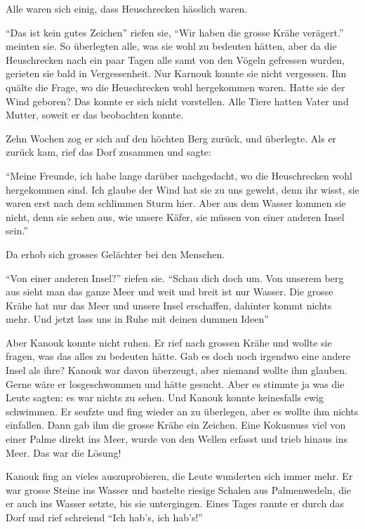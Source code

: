 Alle waren sich einig, dass Heuschrecken hässlich waren. 

\enquote{Das ist kein gutes Zeichen} riefen sie, \enquote{Wir haben die grosse Krähe verägert.} meinten sie. So überlegten alle, was sie wohl zu bedeuten hätten, aber da die Heuschrecken nach ein paar Tagen alle samt von den Vögeln gefressen wurden, gerieten sie bald in Vergessenheit. Nur Karnouk konnte sie nicht vergessen. Ihn quälte die Frage, wo die Heuschrecken wohl hergekommen waren. Hatte sie der Wind geboren? Das konnte er sich nicht vorstellen. Alle Tiere hatten Vater und Mutter, soweit er das beobachten konnte. 

Zehn Wochen zog er sich auf den höchten Berg zurück, und überlegte. Als er zurück kam, rief das Dorf zusammen und sagte: 

\enquote{Meine Freunde, ich habe lange darüber nachgedacht, wo die Heuschrecken wohl hergekommen sind. Ich glaube der Wind hat sie zu uns geweht, denn ihr wisst, sie waren erst nach dem schlimmen Sturm hier. Aber aus dem Wasser kommen sie nicht, denn sie sehen aus, wie unsere Käfer, sie müssen von einer anderen Insel sein.}

Da erhob sich grosses Gelächter bei den Menschen.

\enquote{Von einer anderen Insel?} riefen sie. \enquote{Schau dich doch um. Von unserem berg aus sieht man das ganze Meer und weit und breit ist nur Wasser. Die grosse Krähe hat nur das Meer und unsere Insel erschaffen, dahinter kommt nichts mehr. Und jetzt lass uns in Ruhe mit deinen dummen Ideen}

Aber Kanouk konnte nicht ruhen. Er rief nach grossen Krähe und wollte sie fragen, was das alles zu bedeuten hätte. Gab es doch noch irgendwo eine andere Insel als ihre? Kanouk war davon überzeugt, aber niemand wollte ihm glauben. Gerne wäre er losgeschwommen und hätte gesucht. Aber es stimmte ja was die Leute sagten: es war nichts zu sehen. Und Kanouk konnte keinesfalls ewig schwimmen. Er seufzte und fing wieder an zu überlegen, aber es wollte ihm nichts einfallen. Dann gab ihm die grosse Krähe ein Zeichen. Eine Kokusnuss viel von einer Palme direkt ins Meer, wurde von den Wellen erfasst und trieb hinaus ins Meer. Das war die Lösung! 

Kanouk fing an vieles auszuprobieren, die Leute wunderten sich immer mehr. Er war grosse Steine ins Wasser und bastelte riesige Schalen aus Palmenwedeln, die er auch ins Wasser setzte, bis sie untergingen. Eines Tages rannte er durch das Dorf und rief schreiend \enquote{Ich hab's, ich hab's!}

